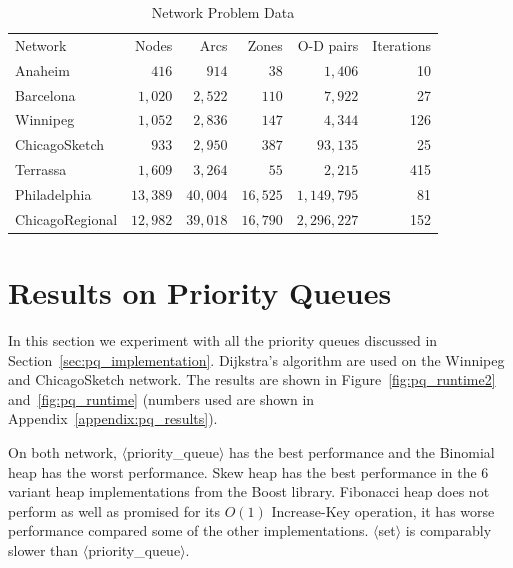 \begin{table}[H]
    \centering
    \begin{tabular}{lrrrr|r} \toprule
        Network         & Nodes & Arcs & Zones & O-D pairs & Iterations \\ \cmidrule(lr){1-6}
        Anaheim         & $  416 $   & $  914$    & $38      $ & $1{,}406   $    & 10  \\
        Barcelona       & $ 1{,}020$ & $ 2{,}522$ & $110     $ & $7{,}922   $    & 27  \\
        Winnipeg        & $ 1{,}052$ & $ 2{,}836$ & $147     $ & $4{,}344   $    & 126 \\
        ChicagoSketch   & $  933 $   & $ 2{,}950$ & $387     $ & $93{,}135  $    & 25  \\ 
        Terrassa        & $ 1{,}609$ & $ 3{,}264$ & $55      $ & $2{,}215   $    & 415 \\
        Philadelphia    & $13{,}389$ & $40{,}004$ & $16{,}525$ & $1{,}149{,}795$ & 81  \\
        ChicagoRegional & $12{,}982$ & $39{,}018$ & $16{,}790$ & $2{,}296{,}227$ & 152 \\
        \bottomrule
    \end{tabular}
    \caption{Network Problem Data}
    \label{table:problemdata}
\end{table}


\section{Results on Priority Queues}

In this section we experiment with all the priority queues discussed in Section~\ref{sec:pq_implementation}.
Dijkstra's algorithm are used on the Winnipeg and ChicagoSketch network.
The results are shown in Figure~\ref{fig:pq_runtime2} and~\ref{fig:pq_runtime} (numbers used are shown in Appendix~\ref{appendix:pq_results}).

On both network, 
$\langle$priority\_queue$\rangle$ has the best performance and the Binomial heap has the worst performance.
Skew heap has the best performance in the 6 variant heap implementations from the Boost library.
Fibonacci heap does not perform as well as promised for its $O(1)$ Increase-Key operation, it has worse performance compared some of the other implementations.
$\langle$set$\rangle$ is comparably slower than $\langle$priority\_queue$\rangle$.

